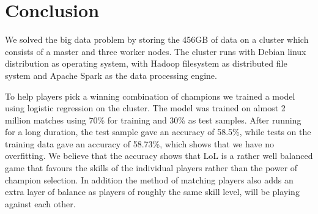 \section{Conclusion}\label{sec:conclusion}
We solved the big data problem by storing the 456GB of data on a cluster which consists of a master and three worker nodes. The cluster runs with Debian linux distribution as operating system, with Hadoop filesystem as distributed file system and Apache Spark as the data processing engine.

To help players pick a winning combination of champions we trained a model using logistic regression on the cluster. The model was trained on almost 2 million matches using 70\% for training and 30\% as test samples. After running for a long duration, the test sample gave an accuracy of 58.5\%, while tests on the training data gave an accuracy of 58.73\%, which shows that we have no overfitting. We believe that the accuracy shows that LoL is a rather well balanced game that favours the skills of the individual players rather than the power of champion selection. In addition the method of matching players also adds an extra layer of balance as players of roughly the same skill level, will be playing against each other.




